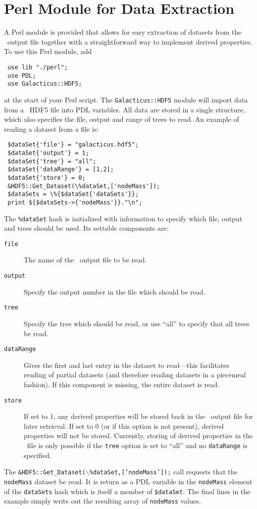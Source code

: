 \section{Perl Module for Data Extraction}

A Perl module is provided that allows for easy extraction of datasets from the \glc\ output file together with a straightforward way to implement derived properties. To use this Perl module, add
\begin{verbatim}
 use lib "./perl";
 use PDL;
 use Galacticus::HDF5;
\end{verbatim}
at the start of your Perl script. The {\tt Galacticus::HDF5} module will import data from a \glc\ HDF5 file into PDL variables. All data are stored in a single structure, which also specifies the file, output and range of trees to read. An example of reading a dataset from a file is:
\begin{verbatim}
 $dataSet{'file'} = "galacticus.hdf5";
 $dataSet{'output'} = 1;
 $dataSet{'tree'} = "all";
 $dataSet{'dataRange'} = [1,2];
 $dataSet{'store'} = 0;
 &HDF5::Get_Dataset(\%dataSet,['nodeMass']);
 $dataSets = \%{$dataSet{'dataSets'}};
 print ${$dataSets->{'nodeMass'}}."\n";
\end{verbatim}
The {\tt \%dataSet} hash is initialized with information to specify which file, output and trees should be used. Its settable components are:
\begin{description}
 \item [{\tt file}] The name of the \glc\ output file to be read.
 \item [{\tt output}] Specify the output number in the file which should be read.
 \item [{\tt tree}] Specify the tree which should be read, or use ``all'' to specify that all trees be read.
 \item [{\tt dataRange}] Gives the first and last entry in the dataset to read---this facilitates reading of partial datasets (and therefore reading datasets in a piecemeal fashion). If this component is missing, the entire dataset is read.
 \item[{\tt store}] If set to 1, any derived properties will be stored back in the \glc\ output file for later retrieval. If set to 0 (or if this option is not present), derived properties will not be stored. Currently, storing of derived properties in the \glc\ file is only possible if the {\tt tree} option is set to ``all'' and no {\tt dataRange} is specified.
\end{description}
The {\tt \&HDF5::Get\_Dataset($\backslash$\%dataSet,['nodeMass']);} call requests that the {\tt nodeMass} dataset be read. It is return as a PDL variable in the {\tt nodeMass} element of the {\tt dataSets} hash which is itself a member of {\tt \$dataSet}. The final lines in the example simply write out the resulting array of {\tt nodeMass} values.


